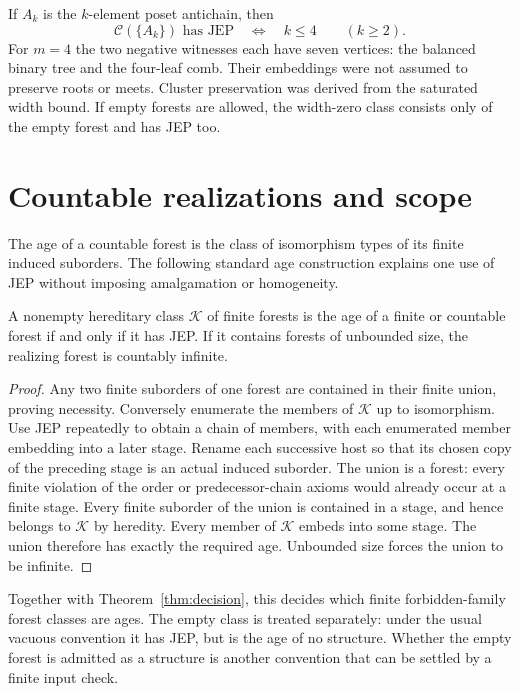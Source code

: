 \documentclass[11pt]{article}
\begin{document}
If $A_k$ is the $k$-element poset antichain, then
\[
 \mathcal C(\{A_k\})\text{ has JEP}\quad\Longleftrightarrow\quad k\leq4
 \qquad(k\geq2).
\]
For $m=4$ the two negative witnesses each have seven vertices: the
balanced binary tree and the four-leaf comb. Their embeddings were not
assumed to preserve roots or meets. Cluster preservation was derived
from the saturated width bound. If empty forests are allowed, the
width-zero class consists only of the empty forest and has JEP too.

\section{Countable realizations and scope}
The age of a countable forest is the class of isomorphism types of its
finite induced suborders. The following standard age construction
explains one use of JEP without imposing amalgamation or homogeneity.

\begin{proposition}\label{prop:age}
A nonempty hereditary class $\mathcal K$ of finite forests is the age
of a finite or countable forest if and only if it has JEP. If it contains
forests of unbounded size, the realizing forest is countably infinite.
\end{proposition}
\begin{proof}
Any two finite suborders of one forest are contained in their finite
union, proving necessity. Conversely enumerate the members of
$\mathcal K$ up to isomorphism. Use JEP repeatedly to obtain a chain
of members, with each enumerated member embedding into a later stage.
Rename each successive host so that its chosen copy of the preceding
stage is an actual induced suborder. The union is a forest: every
finite violation of the order or predecessor-chain axioms would already
occur at a finite stage. Every finite suborder of the union is contained
in a stage, and hence belongs to $\mathcal K$ by heredity. Every member
of $\mathcal K$ embeds into some stage. The union therefore has exactly
the required age. Unbounded size forces the union to be infinite.
\end{proof}

Together with Theorem~\ref{thm:decision}, this decides which finite
forbidden-family forest classes are ages. The empty class is treated
separately: under the usual vacuous convention it has JEP, but is the
age of no structure. Whether the empty forest is admitted as a structure
is another convention that can be settled by a finite input check.
\end{document}
